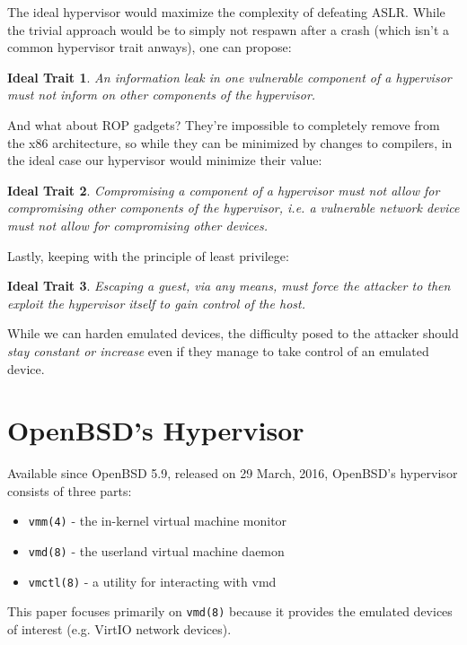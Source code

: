 \documentclass[conference]{IEEEtran}
\newtheorem{trait}{Ideal Trait}
\begin{document}
The ideal hypervisor would maximize the complexity of defeating
ASLR. While the trivial approach would be to simply not respawn after
a crash (which isn't a common hypervisor trait anways), one can
propose:

\begin{trait} \label{trait1}
  An information leak in one vulnerable component of a hypervisor must
  not inform on other components of the hypervisor.
\end{trait}

And what about ROP gadgets? They're impossible to completely remove
from the x86 architecture, so while they can be minimized by changes
to compilers, in the ideal case our hypervisor would minimize their
value:

\begin{trait} \label{trait2}
  Compromising a component of a hypervisor must not allow for
  compromising other components of the hypervisor, i.e. a vulnerable
  network device must not allow for compromising other devices.
\end{trait}

Lastly, keeping with the principle of least privilege:

\begin{trait} \label{trait3}
  Escaping a guest, via any means, must force the attacker to then
  exploit the hypervisor itself to gain control of the host.
\end{trait}

While we can harden emulated devices, the difficulty posed to the
attacker should \emph{stay constant or increase} even if they manage
to take control of an emulated device.

\vspace{5mm}
\section{OpenBSD's Hypervisor}
Available since OpenBSD 5.9, released on 29 March, 2016, OpenBSD's
hypervisor consists of three parts:

\begin{itemize}
\item \texttt{vmm(4)} - the in-kernel virtual machine monitor
\item \texttt{vmd(8)} - the userland virtual machine daemon
\item \texttt{vmctl(8)} - a utility for interacting with vmd
\end{itemize}

This paper focuses primarily on \texttt{vmd(8)} because it provides
the emulated devices of interest (e.g. VirtIO network devices).
\end{document}
